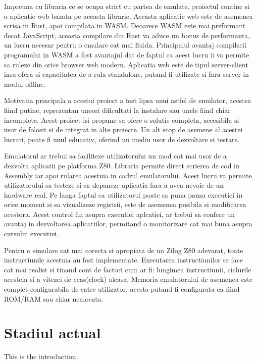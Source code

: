 \documentclass[titlepage,12pt]{article}
\begin{document}
    Impreuna cu libraria ce se ocupa strict cu partea de emulate, proiectul contine si o aplicatie web bazata pe aceasta librarie.
    Aceasta aplicatie web este de asemenea scrisa in Rust, apoi compilata in \ac {WASM}. Deoarece \ac {WASM} este mai preformant decat JavaScript, aceasta compilare din Rust va aduce un bonus de performanta, un lucru necesar pentru o emulare cat mai fluida.
    Principalul avantaj compilarii programului in \ac {WASM} a fost avantajul dat de faptul ca acest lucru ii va permite sa ruleze din orice browser web modern.
    Aplicatia web este de tipul server-client insa ofera si capacitatea de a rula standalone, putand fi utilizate si fara server in modul offline.

    Motivatia principala a acestui proiect a fost lipsa unui astfel de emulator, acestea fiind putine, reprezentan uneori dificultati la instalare sau unele fiind chiar incomplete.
    Acest proiect isi propune sa ofere o solutie completa, accesibila si usor de folosit si de integrat in alte proiecte. Un alt scop de asemene al acestei lucrari, poate fi unul educativ, oferind un mediu usor de dezvoltare si testare.

    Emulatorul ar trebui sa faciliteze utilizatorului un mod cat mai usor de a dezvolta aplicatii pe platforma Z80.
    Libraria permite direct scrierea de cod in Assembly iar apoi rularea acestuia in cadrul emulatorului. Acest lucru va permite utilizatorului sa testeze si sa depaneze aplicatia fara a avea nevoie de un hardware real.
    Pe langa faptul ca utilizatorul poate sa puna pauza executiei in orice moment si sa vizualizeze registrii, este de asemenea posibila si modificarea acestora.
    Acest control fin asupra executiei aplcatiei, ar trebui sa confere un avantaj in dezvoltarea aplicatiilor, permitand o monitorizare cat mai buna asupra cursului executiei.

    Pentru o simulare cat mai corecta si apropiata de un Zilog Z80 adevarat, toate instructiunile acestuia au fost implementate.
    Executarea instructiunilor se face cat mai realist si tinand cont de factori cum ar fi: lungimea instructiunii, ciclurile acesteia si a vitezei de ceas(clock) aleasa.
    Memoria emulatorului de asemenea este complet configurabila de catre utilizator, acesta putand fi configurata ca fiind \ac {ROM}/\ac {RAM} sau chiar nealocata.


    \section{Stadiul actual}
    This is the introduction.
\end{document}
